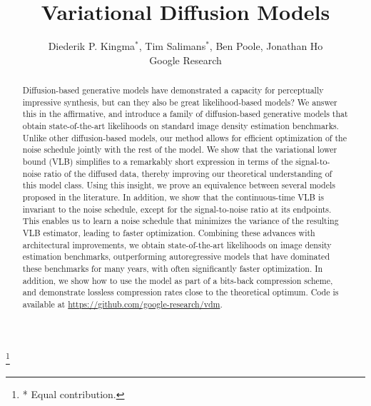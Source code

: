 \documentclass{article}
\title{Variational Diffusion Models}
\author{%
  Diederik P. Kingma$^*$, Tim Salimans$^*$, Ben Poole, Jonathan Ho\\
  Google Research\\
}
\begin{document}
{\let\thefootnote\relax\footnote{* Equal contribution.}}
\maketitle

\begin{abstract}
%
Diffusion-based generative models have demonstrated a capacity for perceptually impressive synthesis, but can they also be great likelihood-based models? We answer this in the affirmative, and introduce a family of diffusion-based generative models that obtain state-of-the-art likelihoods on standard image density estimation benchmarks. Unlike other diffusion-based models, our method allows for efficient optimization of the noise schedule jointly with the rest of the model. We show that the variational lower bound (VLB) simplifies to a remarkably short expression in terms of the signal-to-noise ratio of the diffused data, thereby improving our theoretical understanding of this model class. Using this insight, we prove an equivalence between several models proposed in the literature. In addition, we show that the continuous-time VLB is invariant to the noise schedule, except for the signal-to-noise ratio at its endpoints. This enables us to learn a noise schedule that minimizes the variance of the resulting VLB estimator, leading to faster optimization. Combining these advances with architectural improvements, we obtain state-of-the-art likelihoods on image density estimation benchmarks, outperforming autoregressive models that have dominated these benchmarks for many years, with often significantly faster optimization. In addition, we show how to use the model as part of a bits-back compression scheme, and demonstrate lossless compression rates close to the theoretical optimum. Code is available at \url{https://github.com/google-research/vdm}.

%

%

%

%


%
%
%
%

%
%

\end{abstract}
\end{document}
